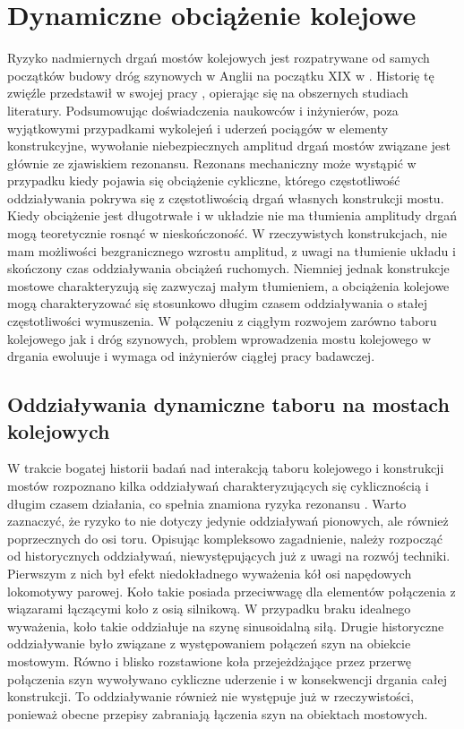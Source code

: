 \section{Dynamiczne obciążenie kolejowe}
Ryzyko nadmiernych drgań mostów kolejowych jest rozpatrywane od samych początków budowy dróg szynowych w Anglii na początku XIX w \parencite{Ladislav1996}. Historię tę zwięźle przedstawił w swojej pracy \cite{Szafranski2013}, opierając się na obszernych studiach literatury. Podsumowując doświadczenia naukowców i inżynierów, poza wyjątkowymi przypadkami wykolejeń i uderzeń pociągów w elementy konstrukcyjne, wywołanie niebezpiecznych amplitud drgań mostów związane jest głównie ze zjawiskiem rezonansu. Rezonans mechaniczny może wystąpić w przypadku kiedy pojawia się obciążenie cykliczne, którego częstotliwość oddziaływania pokrywa się z częstotliwością drgań własnych konstrukcji mostu. Kiedy obciążenie jest długotrwałe i w układzie nie ma tłumienia amplitudy drgań mogą teoretycznie rosnąć w nieskończoność. W rzeczywistych konstrukcjach, nie mam możliwości bezgranicznego wzrostu amplitud, z uwagi na tłumienie układu i skończony czas oddziaływania obciążeń ruchomych. Niemniej jednak konstrukcje mostowe charakteryzują się zazwyczaj małym tłumieniem, a obciążenia kolejowe mogą charakteryzować się stosunkowo długim czasem oddziaływania o stałej częstotliwości wymuszenia. W połączeniu z ciągłym rozwojem zarówno taboru kolejowego jak i dróg szynowych, problem wprowadzenia mostu kolejowego w drgania ewoluuje i wymaga od inżynierów ciągłej pracy badawczej.


\subsection{Oddziaływania dynamiczne taboru na mostach kolejowych}
W trakcie bogatej historii badań nad interakcją taboru kolejowego i konstrukcji mostów rozpoznano kilka oddziaływań charakteryzujących się cyklicznością i długim czasem działania, co spełnia znamiona ryzyka rezonansu \parencite{Fryba2001}. Warto zaznaczyć, że ryzyko to nie dotyczy jedynie oddziaływań pionowych, ale również poprzecznych do osi toru. Opisując kompleksowo zagadnienie, należy rozpocząć od historycznych oddziaływań, niewystępujących już z uwagi na rozwój techniki. Pierwszym z nich był efekt niedokładnego wyważenia kół osi napędowych lokomotywy parowej. Koło takie posiada przeciwwagę dla elementów połączenia z wiązarami łączącymi koło z osią silnikową. W przypadku braku idealnego wyważenia, koło takie oddziałuje na szynę sinusoidalną siłą. Drugie historyczne oddziaływanie było związane z występowaniem połączeń szyn na obiekcie mostowym. Równo i blisko rozstawione koła przejeżdżające przez przerwę połączenia szyn wywoływano cykliczne uderzenie i w konsekwencji drgania całej konstrukcji. To oddziaływanie również nie występuje już w rzeczywistości, ponieważ obecne przepisy zabraniają łączenia szyn na obiektach mostowych.

